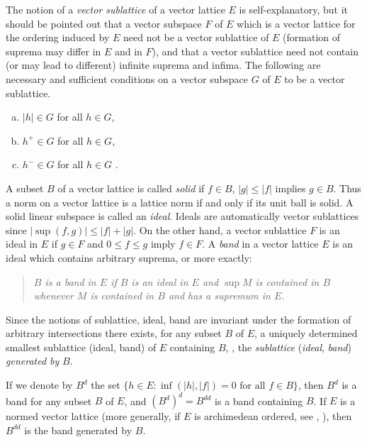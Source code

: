 The notion of a \emph{vector sublattice} of a vector lattice $ E $ is self-explanatory, but it should be pointed out that a vector subspace $ F $ of $ E $ which is a vector lattice for the ordering induced by $ E $ need not be a vector sublattice of $ E $ (formation of suprema may differ in $ E $ and in $ F $), and that a vector sublattice need not contain (or may lead to different) infinite suprema and infima.
The following are necessary and sufficient conditions on a vector subspace $ G $ of $ E $ to be a vector sublattice.
\begin{enumerate}[(a)]
	\item 
	$ |h| \in G $ for all $ h \in G $, 

	\item 
	$ h^{+} \in G $ for all $ h \in G $, 
	
	\item 
	$ h^{-} \in G $ for all $ h \in G $ .
\end{enumerate}
A subset $ B $ of a vector lattice is called \emph{solid} if $ f \in B $, $ |g| \leq |f| $ implies $ g \in B $.
Thus a norm on a vector lattice is a lattice norm if and only if its unit ball is solid.
A solid linear subspace is called an \emph{ideal}.
Ideals are automatically vector sublattices since $ |\sup(f,g)| \leq |f| + |g| $.
On the other hand, a vector sublattice $ F $ is an ideal in $ E $ if $ g \in F $ and $ 0 \leq f \leq g $ imply $ f \in F $.
A \emph{band} in a vector lattice $ E $ is an ideal which contains arbitrary suprema, or more exactly: 
\begin{quote}
\emph{$ B $ is a band in $ E $ if $ B $ is an ideal in $ E $ and $ \sup M $ is contained in $ B $ whenever $ M $ is contained in $ B $ and has a supremum in $ E $.}
\end{quote}
Since the notions of sublattice, ideal, band are invariant under the formation of arbitrary intersections there exists, for any subset $ B $ of $ E $, a uniquely determined smallest sublattice (ideal, band) of $ E $ containing $ B $, \ie, the \emph{sublattice} (\emph{ideal}, \emph{band}) \emph{generated by} $ B $.

If we denote by $ B^{d} $ the set $ \{h \in E \colon \inf(|h|,|f|) = 0 \text{ for all } f \in B\} $, then $ B^{d} $ is a band for any subset $ B $ of $ E $, and $ (B^{d})^{d} = B^{dd} $ is a band containing $ B $.
If $ E $ is a normed vector lattice (more generally, if $ E $ is archimedean ordered, see \eg, \citet{schaefer:1974}), then $ B^{dd} $ is the band generated by $ B $.

